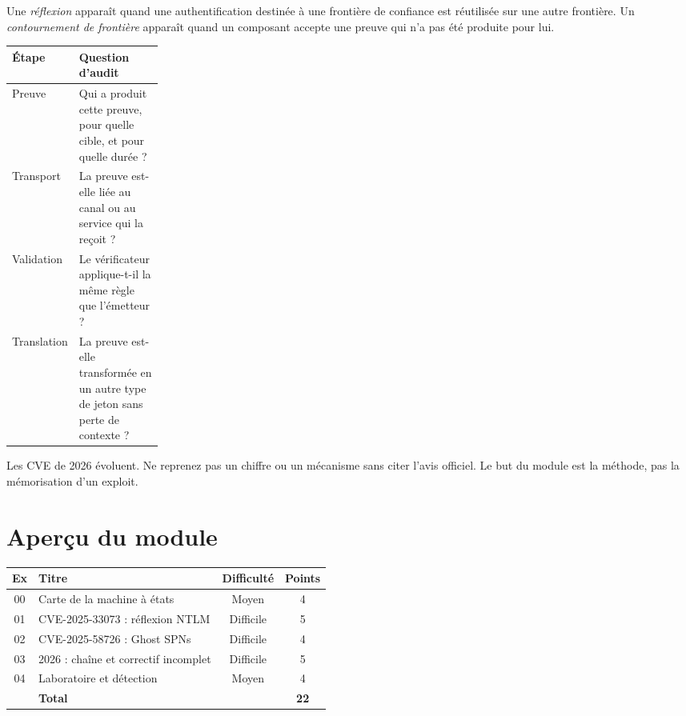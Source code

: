 \documentclass{training}
\begin{document}
Une \emph{réflexion} apparaît quand une authentification destinée à une
frontière de confiance est réutilisée sur une autre frontière. Un
\emph{contournement de frontière} apparaît quand un composant accepte une
preuve qui n'a pas été produite pour lui.

\begin{center}
\begin{tabularx}{\linewidth}{|p{0.22\linewidth}|X|}
\hline
\textbf{Étape} & \textbf{Question d'audit} \\ \hline
Preuve & Qui a produit cette preuve, pour quelle cible, et pour quelle
durée ? \\ \hline
Transport & La preuve est-elle liée au canal ou au service qui la reçoit ? \\ \hline
Validation & Le vérificateur applique-t-il la même règle que l'émetteur ? \\ \hline
Translation & La preuve est-elle transformée en un autre type de jeton
sans perte de contexte ? \\ \hline
\end{tabularx}
\end{center}

\begin{warn}
Les CVE de 2026 évoluent. Ne reprenez pas un chiffre ou un mécanisme sans
citer l'avis officiel. Le but du module est la méthode, pas la mémorisation
d'un exploit.
\end{warn}

\chapter{Aperçu du module}

\begin{center}
\begin{tabularx}{\linewidth}{|c|l|c|c|}
\hline
\textbf{Ex} & \textbf{Titre} & \textbf{Difficulté} & \textbf{Points} \\ \hline
00 & Carte de la machine à états & Moyen & 4 \\
01 & CVE-2025-33073 : réflexion NTLM & Difficile & 5 \\
02 & CVE-2025-58726 : Ghost SPNs & Difficile & 4 \\
03 & 2026 : chaîne et correctif incomplet & Difficile & 5 \\
04 & Laboratoire et détection & Moyen & 4 \\ \hline
& \textbf{Total} & & \textbf{22} \\ \hline
\end{tabularx}
\end{center}
\end{document}
